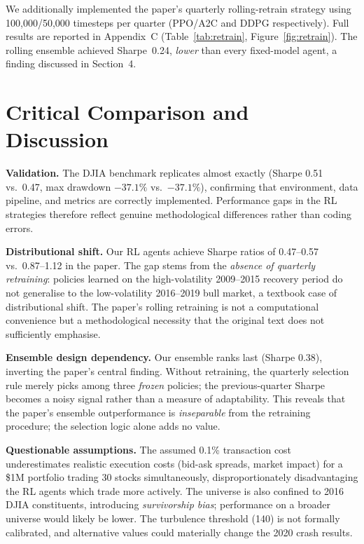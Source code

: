 \documentclass[11pt,a4paper]{article}
\begin{document}
We additionally implemented the paper's quarterly rolling-retrain strategy
using 100,000/50,000 timesteps per quarter (PPO/A2C and DDPG respectively).
Full results are reported in Appendix~C (Table~\ref{tab:retrain},
Figure~\ref{fig:retrain}). The rolling ensemble achieved Sharpe~0.24,
\emph{lower} than every fixed-model agent, a finding discussed in Section~4.

\section{Critical Comparison and Discussion}

\textbf{Validation.}
The DJIA benchmark replicates almost exactly (Sharpe 0.51 vs.\ 0.47,
max drawdown $-37.1\%$ vs.\ $-37.1\%$), confirming that environment,
data pipeline, and metrics are correctly implemented.
Performance gaps in the RL strategies therefore reflect genuine
methodological differences rather than coding errors.

\textbf{Distributional shift.}
Our RL agents achieve Sharpe ratios of 0.47--0.57 vs.\ 0.87--1.12 in the paper.
The gap stems from the \emph{absence of quarterly retraining}: policies learned
on the high-volatility 2009--2015 recovery period do not generalise to the
low-volatility 2016--2019 bull market, a textbook case of distributional shift.
The paper's rolling retraining is not a computational convenience but a
methodological necessity that the original text does not sufficiently emphasise.

\textbf{Ensemble design dependency.}
Our ensemble ranks last (Sharpe 0.38), inverting the paper's central finding.
Without retraining, the quarterly selection rule merely picks among three
\emph{frozen} policies; the previous-quarter Sharpe becomes a noisy signal
rather than a measure of adaptability.
This reveals that the paper's ensemble outperformance is \emph{inseparable}
from the retraining procedure; the selection logic alone adds no value.

\textbf{Questionable assumptions.}
The assumed 0.1\% transaction cost underestimates realistic execution costs
(bid-ask spreads, market impact) for a \$1M portfolio trading 30 stocks
simultaneously, disproportionately disadvantaging the RL agents which trade
more actively. The universe is also confined to 2016 DJIA constituents,
introducing \emph{survivorship bias}; performance on a broader universe would
likely be lower. The turbulence threshold (140) is not formally calibrated,
and alternative values could materially change the 2020 crash results.
\end{document}
